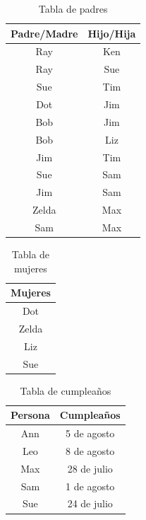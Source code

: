 \message{ !name(main.tex)}\documentclass[12pt,a4paper]{book}
\begin{document}
    \begin{table}[htbp]
        \centering
        \caption{Tabla de padres}
        \renewcommand{\arraystretch}{1.3}
        \begin{tabular}{c c}
            Padre/Madre & Hijo/Hija\\
            \hline
            Ray & Ken\\
            Ray & Sue\\
            Sue & Tim\\
            Dot & Jim\\
            Bob & Jim\\
            Bob & Liz\\
            Jim & Tim\\
            Sue & Sam\\
            Jim & Sam\\
            Zelda & Max\\
            Sam & Max\\
        \end{tabular}
    \end{table}

    \begin{table}[htbp]
        \centering
        \caption{Tabla de mujeres}
        \renewcommand{\arraystretch}{1.3}
        \begin{tabular}{c}
            Mujeres\\
            \hline
            Dot\\
            Zelda\\
            Liz\\
            Sue\\
        \end{tabular}
    \end{table}

    \begin{table}[htbp]
        \centering
        \caption{Tabla de cumpleaños}
        \renewcommand{\arraystretch}{1.3}
        \begin{tabular}{c c}
            Persona & Cumpleaños\\
            \hline
            Ann & 5 de agosto\\
            Leo & 8 de agosto\\
            Max & 28 de julio\\
            Sam & 1 de agosto\\
            Sue & 24 de julio\\
        \end{tabular}
    \end{table}
\end{document}
